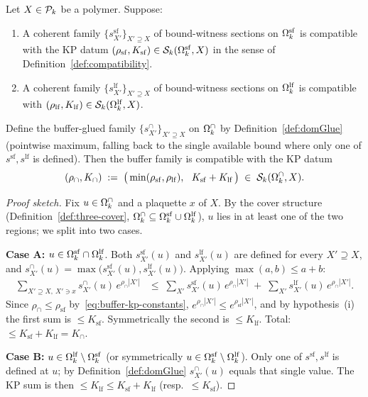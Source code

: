 \begin{proposition}
\label{prop:summability-preservation}
Let $X \in \mathcal{P}_k$ be a polymer.  Suppose:
\begin{enumerate}
  \item[(i)] A coherent family $\{s^{\mathrm{sf}}_{X'}\}_{X' \supseteq X}$ of bound-witness sections on $\Omega_k^{\mathrm{sf}}$ is compatible with the KP datum $(\rho_{\mathrm{sf}}, K_{\mathrm{sf}}) \in \mathcal{S}_k(\Omega_k^{\mathrm{sf}}, X)$ in the sense of Definition~\ref{def:compatibility}.
  \item[(ii)] A coherent family $\{s^{\mathrm{lf}}_{X'}\}_{X' \supseteq X}$ of bound-witness sections on $\Omega_k^{\mathrm{lf}}$ is compatible with $(\rho_{\mathrm{lf}}, K_{\mathrm{lf}}) \in \mathcal{S}_k(\Omega_k^{\mathrm{lf}}, X)$.
\end{enumerate}
Define the buffer-glued family $\{s^{\cap}_{X'}\}_{X' \supseteq X}$ on $\Omega_k^{\cap}$ by Definition~\ref{def:domGlue} (pointwise maximum, falling back to the single available bound where only one of $s^{\mathrm{sf}}, s^{\mathrm{lf}}$ is defined).  Then the buffer family is compatible with the KP datum
\begin{equation}
  \label{eq:buffer-kp-constants}
  (\rho_{\cap}, K_{\cap}) \;:=\; \bigl(\, \min(\rho_{\mathrm{sf}}, \rho_{\mathrm{lf}}),\ \ K_{\mathrm{sf}} + K_{\mathrm{lf}}\, \bigr) \;\in\; \mathcal{S}_k(\Omega_k^{\cap}, X).
\end{equation}
\end{proposition}

\begin{proof}[Proof sketch]
Fix $u \in \Omega_k^{\cap}$ and a plaquette $x$ of $X$.  By the cover structure (Definition~\ref{def:three-cover}, $\Omega_k^{\cap} \subseteq \Omega_k^{\mathrm{sf}} \cup \Omega_k^{\mathrm{lf}}$), $u$ lies in at least one of the two regions; we split into two cases.

\textbf{Case A:} $u \in \Omega_k^{\mathrm{sf}} \cap \Omega_k^{\mathrm{lf}}$.  Both $s^{\mathrm{sf}}_{X'}(u)$ and $s^{\mathrm{lf}}_{X'}(u)$ are defined for every $X' \supseteq X$, and $s^{\cap}_{X'}(u) = \max\!\bigl(s^{\mathrm{sf}}_{X'}(u), s^{\mathrm{lf}}_{X'}(u)\bigr)$.  Applying $\max(a, b) \le a + b$:
\begin{align*}
  \sum_{X' \supseteq X,\ X' \ni x} s^{\cap}_{X'}(u)\, e^{\rho_{\cap} |X'|}
  &\le\; \sum_{X'} s^{\mathrm{sf}}_{X'}(u)\, e^{\rho_{\cap} |X'|} \;+\; \sum_{X'} s^{\mathrm{lf}}_{X'}(u)\, e^{\rho_{\cap} |X'|}.
\end{align*}
Since $\rho_{\cap} \le \rho_{\mathrm{sf}}$ by~\eqref{eq:buffer-kp-constants}, $e^{\rho_{\cap} |X'|} \le e^{\rho_{\mathrm{sf}} |X'|}$, and by hypothesis~(i) the first sum is $\le K_{\mathrm{sf}}$.  Symmetrically the second is $\le K_{\mathrm{lf}}$.  Total: $\le K_{\mathrm{sf}} + K_{\mathrm{lf}} = K_{\cap}$.

\textbf{Case B:} $u \in \Omega_k^{\mathrm{lf}} \setminus \Omega_k^{\mathrm{sf}}$ (or symmetrically $u \in \Omega_k^{\mathrm{sf}} \setminus \Omega_k^{\mathrm{lf}}$).  Only one of $s^{\mathrm{sf}}, s^{\mathrm{lf}}$ is defined at $u$; by Definition~\ref{def:domGlue} $s^{\cap}_{X'}(u)$ equals that single value.  The KP sum is then $\le K_{\mathrm{lf}} \le K_{\mathrm{sf}} + K_{\mathrm{lf}}$ (resp.\ $\le K_{\mathrm{sf}}$).
\end{proof}

